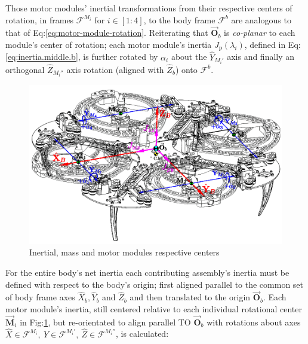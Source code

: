 \par
Those motor modules' inertial transformations from their respective centers of rotation, in frames $\mathcal{F}^{M_i}$ for $i\in[1:4]$, to the body frame $\mathcal{F}^b$ are analogous to that of Eq:\ref{eq:motor-module-rotation}. Reiterating that $\vec{\mathbf{O}}_b$ is \emph{co-planar} to each module's center of rotation; each motor module's inertia $J_\text{p}(\lambda_i)$, defined in Eq:\ref{eq:inertia.middle.b}, is further rotated by $\alpha_{i}$ about the $\hat{Y}_{M_i'}$ axis and finally an orthogonal $\hat{Z}_{M_i''}$  axis rotation (aligned with $\hat{Z}_b$) onto $\mathcal{F}^b$. 
\par
\begin{figure}[hbtp]
\vspace{-6pt}
\centering
\includegraphics[width=\textwidth]{figs/inertia-frame}
\caption{Inertial, mass and motor modules respective centers}
\label{fig:inertia-frame}
\vspace{-6pt}
\end{figure}
For the entire body's net inertia each contributing assembly's inertia must be defined with respect to the body's origin; first aligned parallel to the common set of body frame axes $\hat{X}_b,\hat{Y}_b$ and $\hat{Z}_b$ and then translated to the origin $\vec{\mathbf{O}}_b$. Each motor module's inertia, still centered relative to each individual rotational center $\vec{\mathbf{M}}_i$ in Fig:\ref{fig:inertia-frame}, but re-orientated to align parallel TO $\vec{\mathbf{O}}_b$ with rotations about axes $\hat{X}\in\mathcal{F}^{M_i},~\hat{Y}\in\mathcal{F}^{M_i'},~\hat{Z}\in\mathcal{F}^{M_i''}$, is calculated:
